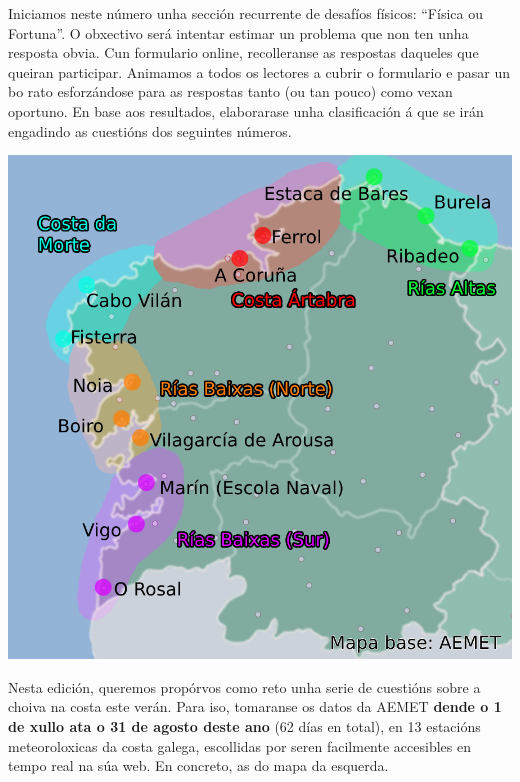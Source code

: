 \begin{multicols}{2}

Iniciamos neste número unha sección recurrente de desafíos físicos: ``Física ou Fortuna''. O obxectivo será intentar estimar un problema que non ten unha resposta obvia. Cun formulario online, recolleranse as respostas daqueles que queiran participar. Animamos a todos os lectores a cubrir o formulario e pasar un bo rato esforzándose para as respostas tanto (ou tan pouco) como vexan oportuno. En base aos resultados, elaborarase unha clasificación á que se irán engadindo as cuestións dos seguintes números.

\begin{center}
    \includegraphics[width=0.8\linewidth]{revistas/002/imaxes/mapa.png}
\end{center}

Nesta edición, queremos propórvos como reto unha serie de cuestións sobre a choiva na costa este verán. Para iso, tomaranse os datos da AEMET \textbf{dende o 1 de xullo ata o 31 de agosto deste ano} (62 días en total), en 13 estacións meteoroloxicas da costa galega, escollidas por seren facilmente accesibles en tempo real na súa web. En concreto, as do mapa da esquerda.


\end{multicols}
